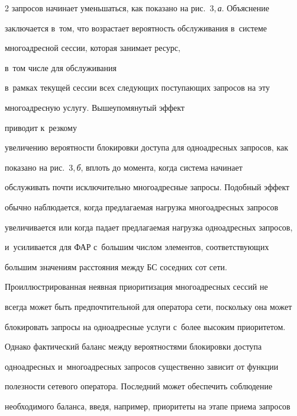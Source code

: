 \begin{multicols}{2}
запросов начинает уменьшаться, как показано на рис.~3,\,\textit{а}. Объяснение 

заключается в~том, что воз\-рас\-та\-ет ве\-ро\-ят\-ность обслуживания в~сис\-те\-ме\linebreak\vspace*{-12pt}



\pagebreak



\noindent

 многоадресной сессии, которая занимает ресурс,

 в~том чис\-ле для обслуживания 

в~рамках текущей сессии всех сле\-ду\-ющих по\-сту\-па\-ющих запросов на эту 

многоадресную услугу. Вышеупомянутый эффект

 приводит к~резкому 

увеличению ве\-ро\-ят\-ности блокировки доступа для одноадресных запросов, как 

показано на рис.~3,\,\textit{б}, вплоть до момента, когда сис\-те\-ма начинает 

обслуживать почти исключительно многоадресные запросы. Подобный эффект 

обычно наблюдается, когда пред\-ла\-га\-емая нагрузка многоадресных запросов 

увеличивается или когда падает пред\-ла\-га\-емая нагрузка одноадресных запросов, 

и~усиливается для ФАР с~большим чис\-лом элементов, со\-от\-вет\-ст\-ву\-ющих 

большим значениям рас\-сто\-яния между БС соседних сот сети.

  

  Проиллюстрированная неявная приоритизация многоадресных сессий не 

всегда может быть предпочтительной для оператора сети, поскольку она может 

блокировать запросы на одноадресные услуги с~более высоким приоритетом. 

Однако фактический баланс между вероятностями блокировки доступа 

одноадресных и~многоадресных запросов существенно зависит от функции 

по\-лез\-ности сетевого оператора. Последний может обеспечить соблюдение 

необходимого баланса,  введя, например, приоритеты на этапе приема запросов 


\end{multicols}
